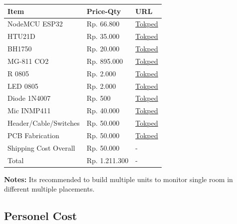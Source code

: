\documentclass[a4paper,12pt,oneside,pdflatex,italian,final,twocolumn]{article}
\begin{document}
	\begin{tabular}{|l|l|l|}
		\toprule
		Item & Price-Qty & URL \\
		\midrule
		NodeMCU ESP32 & Rp. 66.800 & \href{https://www.tokopedia.com/temins/esp32-esp-32-arduino-wifi-bluetooth-iot-development-board-micro-usb}{Tokped} \\
		HTU21D & Rp. 35.000 & \href{https://www.tokopedia.com/akhishop/htu21d-temperature-and-humidity-sensor-module}{Tokped} \\
		BH1750 & Rp. 20.000 & \href{https://www.tokopedia.com/akhishop/gy-302-light-intensity-bh1750-module-sensor-intensitas-cahaya}{Tokped} \\
		MG-811 CO2 & Rp. 895.000 & \href{https://www.tokopedia.com/khursiot/dfrobot-analog-co2-gas-sensor-for-arduino-mg-811-sensor}{Tokped} \\
		R 0805 & Rp. 2.000 & \href{https://www.tokopedia.com/thingie/resistor-0805-5-102-1k-ohm-smd-2012}{Tokped} \\
		LED 0805 & Rp. 2.000 & \href{https://www.tokopedia.com/easyware-id/led-smd-0805-super-bright-all-color-led-smd-0805-semua-warna-putih}{Tokped} \\
		Diode 1N4007 & Rp. 500 & \href{https://www.tokopedia.com/dx-tronics/diode-1n4007-in4007-dioda-rectifier-1a-1000v}{Tokped} \\
		Mic INMP411 & Rp. 40.000 & \href{https://www.tokopedia.com/aifrobotic/inmp441-omnidirectional-microphone-module-mems-i2s-interface}{Tokped} \\
		Header/Cable/Switches & Rp. 50.000 & \href{https://www.tokopedia.com/eltech-online}{Tokped} \\
		PCB Fabrication & Rp. 50.000 & \href{https://www.tokopedia.com/geraicerdas/cetak-pcb-1-keping-single-double-layer-rapid-prototyping-satuan}{Tokped} \\
		Shipping Cost Overall & Rp. 50.000 & - \\
		\midrule
		Total & Rp. 1.211.300  & - \\
		\bottomrule
	\end{tabular}

	\vspace{5pt}
	\textbf{Notes:} Its recommended to build multiple units to monitor single room in different multiple placements.

	\subsection{Personel Cost}
\end{document}
